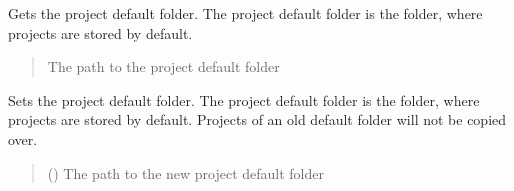 \documentclass[letterpaper,10pt,english]{sphinxmanual}
\begin{document}
\begin{fulllineitems}
\begin{fulllineitems}
\begin{quote}
\begin{description}
\sphinxAtStartPar
{}

\end{description}\end{quote}

\end{fulllineitems}


\begin{fulllineitems}
\label{\detokenize{apidoc/src.osm_configurator.control:src.osm_configurator.control.control_interface.IControl.get_project_default_folder}}
\pysigstartsignatures
{}
\pysigstopsignatures
\sphinxAtStartPar
Gets the project default folder.
The project default folder is the folder, where projects are stored by default.
\begin{quote}\begin{description}
\sphinxAtStartPar
The path to the project default folder

\sphinxAtStartPar
{}

\end{description}\end{quote}

\end{fulllineitems}


\begin{fulllineitems}
\label{\detokenize{apidoc/src.osm_configurator.control:src.osm_configurator.control.control_interface.IControl.set_project_default_folder}}
\pysigstartsignatures
{}
\pysigstopsignatures
\sphinxAtStartPar
Sets the project default folder.
The project default folder is the folder, where projects are stored by default.
Projects of an old default folder will not be copied over.
\begin{quote}\begin{description}
\sphinxAtStartPar
{} () \textendash{} The path to the new project default folder


\end{description}
\end{quote}
\end{fulllineitems}
\end{fulllineitems}
\end{document}
